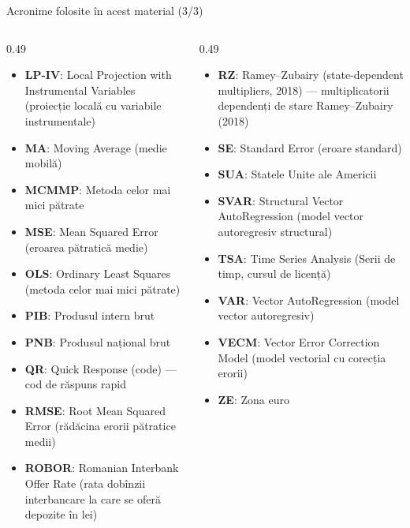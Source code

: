 \begin{frame}{Acronime folosite în acest material (3/3)}
\begin{columns}[T]
\begin{column}{0.49\textwidth}
\begin{itemize}\setlength{\itemsep}{0pt}
    \item \textbf{LP-IV}: Local Projection with Instrumental Variables (proiecție locală cu variabile instrumentale)
    \item \textbf{MA}: Moving Average (medie mobilă)
    \item \textbf{MCMMP}: Metoda celor mai mici pătrate
    \item \textbf{MSE}: Mean Squared Error (eroarea pătratică medie)
    \item \textbf{OLS}: Ordinary Least Squares (metoda celor mai mici pătrate)
    \item \textbf{PIB}: Produsul intern brut
    \item \textbf{PNB}: Produsul național brut
    \item \textbf{QR}: Quick Response (code) — cod de răspuns rapid
    \item \textbf{RMSE}: Root Mean Squared Error (rădăcina erorii pătratice medii)
    \item \textbf{ROBOR}: Romanian Interbank Offer Rate (rata dobînzii interbancare la care se oferă depozite în lei)
\end{itemize}
\end{column}
\begin{column}{0.49\textwidth}
\begin{itemize}\setlength{\itemsep}{0pt}
    \item \textbf{RZ}: Ramey–Zubairy (state-dependent multipliers, 2018) — multiplicatorii dependenți de stare Ramey–Zubairy (2018)
    \item \textbf{SE}: Standard Error (eroare standard)
    \item \textbf{SUA}: Statele Unite ale Americii
    \item \textbf{SVAR}: Structural Vector AutoRegression (model vector autoregresiv structural)
    \item \textbf{TSA}: Time Series Analysis (Serii de timp, cursul de licență)
    \item \textbf{VAR}: Vector AutoRegression (model vector autoregresiv)
    \item \textbf{VECM}: Vector Error Correction Model (model vectorial cu corecția erorii)
    \item \textbf{ZE}: Zona euro
\end{itemize}
\end{column}
\end{columns}
\end{frame}

